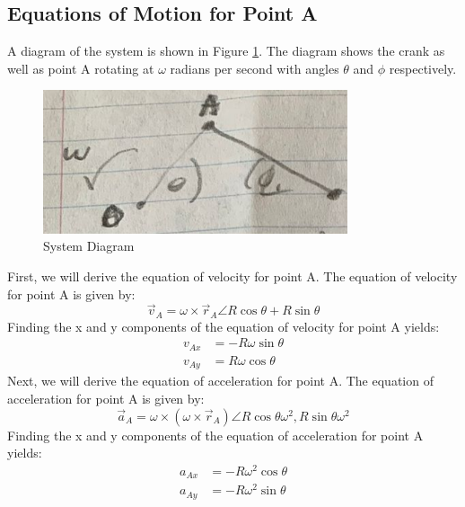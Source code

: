 \documentclass[12pt, titlepage]{article}
\begin{document}
\subsection{Equations of Motion for Point A}
A diagram of the system is shown in Figure \ref{fig:system}. The diagram
shows the crank as well as point A rotating at $\omega$ radians per second
with angles $\theta$ and $\phi$ respectively.
\begin{figure}[H]
    \centering
    \includegraphics[width=0.8\textwidth]{./Images/f1.png}
    \caption{System Diagram}
    \label{fig:system}
\end{figure}
First, we will derive the equation of velocity for point A. The equation of
velocity for point A is given by:
\begin{equation}
    \label{eq:vel}
    \vec{v}_A = \omega \times \vec{r}_A \angle R\cos\theta + R\sin\theta
\end{equation}
Finding the x and y components of the equation of velocity for point A yields:
\begin{equation}
    \label{eq:velxy}
    \begin{split}
        v_{Ax} &= -R\omega\sin\theta\\
        v_{Ay} &= R\omega\cos\theta
    \end{split}
\end{equation}
Next, we will derive the equation of acceleration for point A. The equation of
acceleration for point A is given by:
\begin{equation}
    \label{eq:acc}
    \vec{a}_A = \omega \times (\omega \times \vec{r}_A) \angle
    R\cos\theta\omega^2, R\sin\theta\omega^2
\end{equation}
Finding the x and y components of the equation of acceleration for point A
yields:
\begin{equation}
    \label{eq:accxy}
    \begin{split}
        a_{Ax} &= -R\omega^2\cos\theta\\
        a_{Ay} &= -R\omega^2\sin\theta
    \end{split}
\end{equation}
\end{document}
